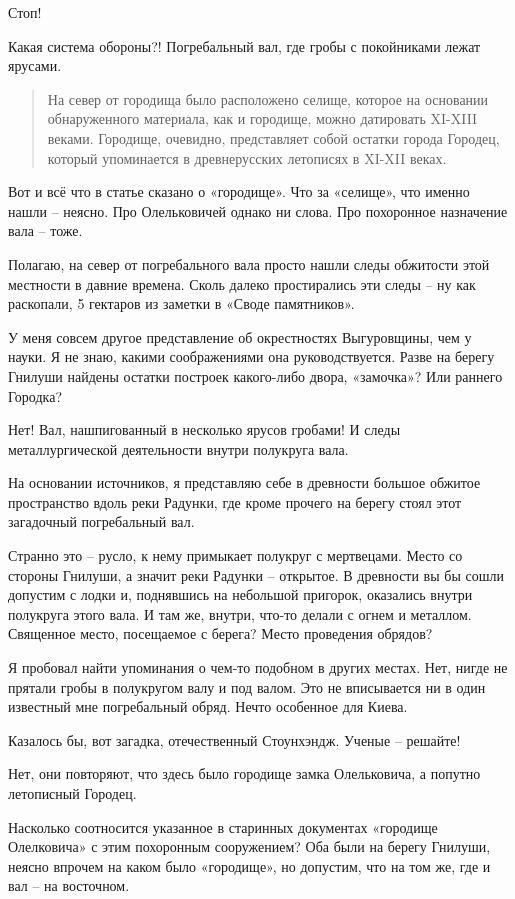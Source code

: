 Стоп!

Какая система обороны?! Погребальный вал, где гробы с покойниками лежат ярусами.

\begin{quotation}
На север от городища было расположено селище, которое на основании обнаруженного материала, как и городище, можно датировать XI-XIII веками. Городище, очевидно, представляет собой остатки города Городец, который упоминается в древнерусских летописях в XI-XII веках.
\end{quotation}

Вот и всё что в статье сказано о «городище». Что за «селище», что именно нашли – неясно. Про Олельковичей однако ни слова. Про похоронное назначение вала – тоже. 

Полагаю, на север от погребального вала просто нашли следы обжитости этой местности в давние времена. Сколь далеко простирались эти следы – ну как раскопали, 5 гектаров из заметки в «Своде памятников».

У меня совсем другое представление об окрестностях Выгуровщины, чем у науки. Я не знаю, какими соображениями она руководствуется. Разве на берегу Гнилуши найдены остатки построек какого-либо двора, «замочка»? Или раннего Городка?

Нет! Вал, нашпигованный в несколько ярусов гробами! И следы металлургической деятельности внутри полукруга вала.

На основании источников, я представляю себе в древности большое обжитое пространство вдоль реки Радунки, где кроме прочего на берегу стоял этот загадочный погребальный вал.

Странно это – русло, к нему примыкает полукруг с мертвецами. Место со стороны Гнилуши, а значит реки Радунки – открытое. В древности вы бы сошли допустим с лодки и, поднявшись на небольшой пригорок, оказались внутри полукруга этого вала. И там же, внутри, что-то делали с огнем и металлом. Священное место, посещаемое с берега? Место проведения обрядов?

Я пробовал найти упоминания о чем-то подобном в других местах. Нет, нигде не прятали гробы в полукругом валу и под валом. Это не вписывается ни в один известный мне погребальный обряд. Нечто особенное для Киева.

Казалось бы, вот загадка, отечественный Стоунхэндж. Ученые – решайте! 

Нет, они повторяют, что здесь было городище замка Олельковича, а попутно летописный Городец.

Насколько соотносится указанное в старинных документах «городище Олелковича» с этим похоронным сооружением? Оба были на берегу Гнилуши, неясно впрочем на каком было «городище», но допустим, что на том же, где и вал – на восточном.

